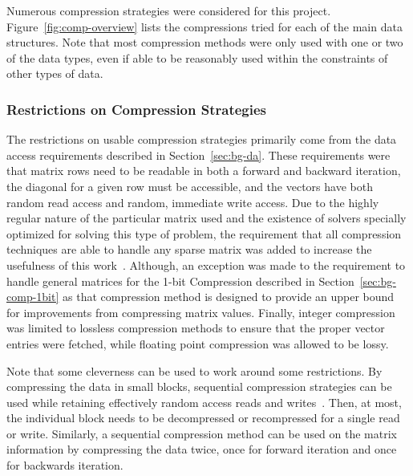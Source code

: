 Numerous compression strategies were considered for this project.
Figure~\ref{fig:comp-overview} lists the compressions tried for each of the main data structures.
Note that most compression methods were only used with one or two of the data types, even if able to be reasonably used within the constraints of other types of data.



\subsubsection{Restrictions on Compression Strategies}
The restrictions on usable compression strategies primarily come from the data access requirements described in Section~\ref{sec:bg-da}.
These requirements were that matrix rows need to be readable in both a forward and backward iteration, the diagonal for a given row must be accessible, and the vectors have both random read access and random, immediate write access.
Due to the highly regular nature of the particular matrix used and the existence of solvers specially optimized for solving this type of problem, the requirement that all compression techniques are able to handle any sparse matrix was added to increase the usefulness of this work~\cite{Saad:2003:IterativeMethods}.
Although, an exception was made to the requirement to handle general matrices for the 1-bit Compression described in Section~\ref{sec:bg-comp-1bit} as that compression method is designed to provide an upper bound for improvements from compressing matrix values.
Finally, integer compression was limited to lossless compression methods to ensure that the proper vector entries were fetched, while floating point compression was allowed to be lossy.

Note that some cleverness can be used to work around some restrictions.
By compressing the data in small blocks, sequential compression strategies can be used while retaining effectively random access reads and writes~\cite{Lindstrom:2014:zfp}.
Then, at most, the individual block needs to be decompressed or recompressed for a single read or write.
Similarly, a sequential compression method can be used on the matrix information by compressing the data twice, once for forward iteration and once for backwards iteration.



